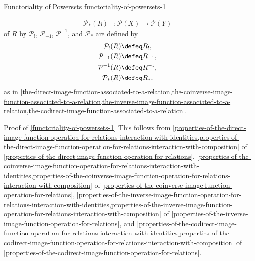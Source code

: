 \begin{proposition}{Functoriality of Powersets \rmI}{functoriality-of-powersets-1}
\begin{itemize}
\begin{align*}
                \mathcal{P}_{*}(R)  &\colon \mathcal{P}(X) \to \mathcal{P}(Y)%
            \end{align*}
            of $R$ by $\mathcal{P}_{!}$, $\mathcal{P}_{-1}$, $\mathcal{P}^{-1}$, and $\mathcal{P}_{*}$ are defined by
            \begin{align*}
                \mathcal{P}_{!}(R)  &\defeq R_{!},\\%
                \mathcal{P}_{-1}(R) &\defeq R_{-1},\\%
                \mathcal{P}^{-1}(R) &\defeq R^{-1},\\%
                \mathcal{P}_{*}(R)  &\defeq R_{*},%
            \end{align*}
            as in \cref{the-direct-image-function-associated-to-a-relation,the-coinverse-image-function-associated-to-a-relation,the-inverse-image-function-associated-to-a-relation,the-codirect-image-function-associated-to-a-relation}.
    \end{itemize}
\end{proposition}
\begin{Proof}{Proof of \cref{functoriality-of-powersets-1}}%
    This follows from \cref{properties-of-the-direct-image-function-operation-for-relations-interaction-with-identities,properties-of-the-direct-image-function-operation-for-relations-interaction-with-composition} of \cref{properties-of-the-direct-image-function-operation-for-relations}, \cref{properties-of-the-coinverse-image-function-operation-for-relations-interaction-with-identities,properties-of-the-coinverse-image-function-operation-for-relations-interaction-with-composition} of \cref{properties-of-the-coinverse-image-function-operation-for-relations}, \cref{properties-of-the-inverse-image-function-operation-for-relations-interaction-with-identities,properties-of-the-inverse-image-function-operation-for-relations-interaction-with-composition} of \cref{properties-of-the-inverse-image-function-operation-for-relations}, and \cref{properties-of-the-codirect-image-function-operation-for-relations-interaction-with-identities,properties-of-the-codirect-image-function-operation-for-relations-interaction-with-composition} of \cref{properties-of-the-codirect-image-function-operation-for-relations}.
\end{Proof}
